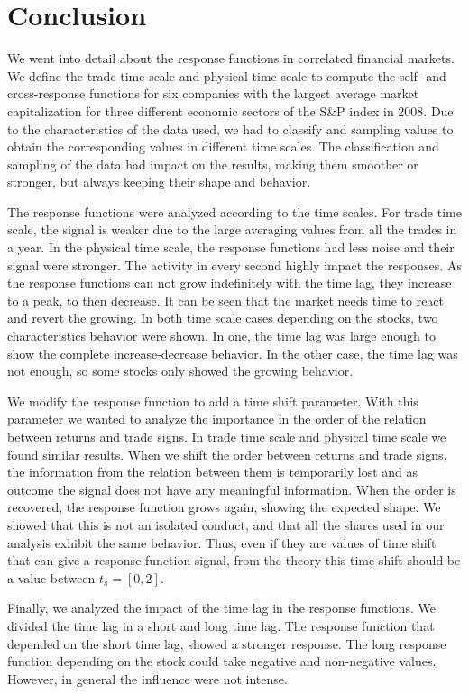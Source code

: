 \section{Conclusion}\label{sec:conclusion}

We went into detail about the response functions in correlated financial
markets. We define the trade time scale and physical time scale to compute the
self- and cross-response functions for six companies with the largest average
market capitalization for three different economic sectors of the S\&P index
in 2008.
Due to the characteristics of the data used, we had to classify and sampling
values to obtain the corresponding values in different time scales.
The classification and sampling of the data had impact on the results, making
them smoother or stronger, but always keeping their shape and behavior.

The response functions were analyzed according to the time scales. For trade
time scale, the signal is weaker due to the large averaging values from all the
trades in a year. In the physical time scale, the response functions had less
noise and their signal were stronger. The activity in every second highly
impact the responses. As the response functions can not grow indefinitely with
the time lag, they increase to a peak, to then decrease. It can be seen that
the market needs time to react and revert the growing. In both time scale cases
depending on the stocks, two characteristics behavior were shown. In one, the
time lag was large enough to show the complete increase-decrease behavior. In
the other case, the time lag was not enough, so some stocks only showed the
growing behavior.

We modify the response function to add a time shift parameter. With this
parameter we wanted to analyze the importance in the order of the relation
between returns and trade signs. In trade time scale and physical time scale we
found similar results. When we shift the order between returns and trade signs,
the information from the relation between them is temporarily lost and as
outcome the signal does not have any meaningful information. When the order is
recovered, the response function grows again, showing the expected shape.
We showed that this is not an isolated conduct, and that all the shares used in
our analysis exhibit the same behavior. Thus, even if they are values of time
shift that can give a response function signal, from the theory this time shift
should be a value between $t_{s} = [0,2]$.

Finally, we analyzed the impact of the time lag in the response functions. We
divided the time lag in a short and long time lag. The response function that
depended on the short time lag, showed a stronger response. The long response
function depending on the stock could take negative and non-negative values.
However, in general the influence were not intense.